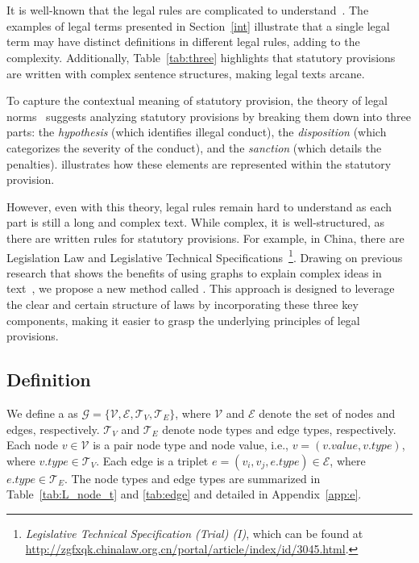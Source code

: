\section{\lawgraph{}} \label{con}
It is well-known that the legal rules are complicated to understand~\cite{zHodi2019limits}. The examples of legal terms presented in Section~\ref{int} illustrate that a single legal term may have distinct definitions in different legal rules, adding to the complexity. Additionally, Table~\ref{tab:three} highlights that statutory provisions are written with complex sentence structures, making legal texts arcane.

To capture the contextual meaning of statutory provision, the theory of legal norms~\cite{legalnorm,keuth1974some} suggests analyzing statutory provisions by breaking them down into three parts: the \textit{hypothesis} (which identifies illegal conduct), the \textit{disposition} (which categorizes the severity of the conduct), and the \textit{sanction} (which details the penalties).  illustrates how these elements are represented within the statutory provision. 

However, even with this theory, legal rules remain hard to understand as each part is still a long and complex text. While complex, it is well-structured, as there are written rules for statutory provisions. For example, in China, there are Legislation Law and Legislative Technical Specifications~\footnote{\textit{Legislative Technical Specification (Trial) (I)}, which can be found at \url{http://zgfxqk.chinalaw.org.cn/portal/article/index/id/3045.html}.}. Drawing on previous research that shows the benefits of using graphs to explain complex ideas in text~\cite{Greco2023BringingOI,wang-etal-2022-d2gclf}, we propose a new method called \lawgraph{}. This approach is designed to leverage the clear and certain structure of laws by incorporating these three key components, making it easier to grasp the underlying principles of legal provisions.



\subsection{\lawgraph{} Definition} \label{dd}
We define a \lawgraph{} as $\mathcal{G}=\{\mathcal{V}, \mathcal{E}, \mathcal{T}_V, \mathcal{T}_E\}$, where $\mathcal{V}$ and $\mathcal{E}$ denote the set of nodes and edges, respectively. $\mathcal{T}_V$ and $\mathcal{T}_E$ denote node types and edge types, respectively. Each node $v\in \mathcal{V}$ is a pair node type and node value, i.e., $v=(v.value, v.type)$, where $v.type\in \mathcal{T}_V$. Each edge is a triplet $e=(v_i, v_j, e.type)\in \mathcal{E}$, where $e.type\in \mathcal{T}_E$. The node types and edge types are summarized in Table~\ref{tab:L_node_t} and \ref{tab:edge} and detailed in Appendix~\ref{app:e}. 

